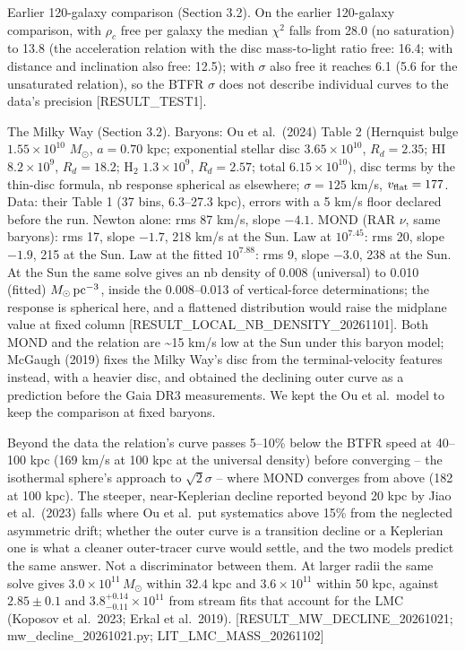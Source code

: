 \documentclass[
  10pt,
]{article}
\begin{document}
Earlier 120-galaxy comparison (Section 3.2). On the earlier 120-galaxy comparison, with $\rho_c$ free per galaxy the median $\chi^2$ falls from 28.0 (no saturation) to 13.8 (the acceleration relation with the disc mass-to-light ratio free: 16.4; with distance and inclination also free: 12.5); with $\sigma$ also free it reaches 6.1 (5.6 for the unsaturated relation), so the BTFR $\sigma$ does not describe individual curves to the data's precision {[}RESULT\_TEST1{]}.

The Milky Way (Section 3.2). Baryons: Ou et al.~(2024) Table 2 (Hernquist bulge $1.55\times10^{10}$ $M_\odot$, $a=0.70$ kpc; exponential stellar disc $3.65\times10^{10}$, $R_d=2.35$; HI $8.2\times10^{9}$, $R_d=18.2$; H$_2$ $1.3\times10^{9}$, $R_d=2.57$; total $6.15\times10^{10}$), disc terms by the thin-disc formula, nb response spherical as elsewhere; $\sigma=125$ km/s, $v_{\rm flat}=177$. Data: their Table 1 (37 bins, 6.3--27.3 kpc), errors with a 5 km/s floor declared before the run. Newton alone: rms 87 km/s, slope $-4.1$. MOND (RAR $\nu$, same baryons): rms 17, slope $-1.7$, 218 km/s at the Sun. Law at $10^{7.45}$: rms 20, slope $-1.9$, 215 at the Sun. Law at the fitted $10^{7.88}$: rms 9, slope $-3.0$, 238 at the Sun. At the Sun the same solve gives an nb density of 0.008 (universal) to 0.010 (fitted) $M_\odot\,{\rm pc}^{-3}$, inside the 0.008--0.013 of vertical-force determinations; the response is spherical here, and a flattened distribution would raise the midplane value at fixed column {[}RESULT\_LOCAL\_NB\_DENSITY\_20261101{]}. Both MOND and the relation are \textasciitilde{}15 km/s low at the Sun under this baryon model; McGaugh (2019) fixes the Milky Way's disc from the terminal-velocity features instead, with a heavier disc, and obtained the declining outer curve as a prediction before the Gaia DR3 measurements. We kept the Ou et al.\ model to keep the comparison at fixed baryons.

Beyond the data the relation's curve passes 5--10\% below the BTFR speed at 40--100 kpc (169 km/s at 100 kpc at the universal density) before converging -- the isothermal sphere's approach to $\sqrt{2}\sigma$ -- where MOND converges from above (182 at 100 kpc). The steeper, near-Keplerian decline reported beyond 20 kpc by Jiao et al.~(2023) falls where Ou et al.\ put systematics above 15\% from the neglected asymmetric drift; whether the outer curve is a transition decline or a Keplerian one is what a cleaner outer-tracer curve would settle, and the two models predict the same answer. Not a discriminator between them. At larger radii the same solve gives $3.0\times10^{11}\,M_\odot$ within 32.4 kpc and $3.6\times10^{11}$ within 50 kpc, against $2.85\pm0.1$ and $3.8^{+0.14}_{-0.11}\times10^{11}$ from stream fits that account for the LMC (Koposov et al.~2023; Erkal et al.~2019). {[}RESULT\_MW\_DECLINE\_20261021; mw\_decline\_20261021.py; LIT\_LMC\_MASS\_20261102{]}
\end{document}
